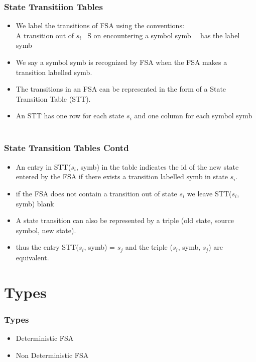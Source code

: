 \documentclass{beamer}
\begin{document}
\begin{frame}
    \frametitle{State Transitiion Tables}
    \begin{itemize}
        \item We label the transitions of FSA using the conventions:\\
            A transition out of $s_i$ \epsilon\ S on encountering a symbol symb \epsilon \ \Sigma\ has the label symb
        \item We say a symbol symb is recognized by FSA when the FSA makes a transition labelled symb.
        \item The transitions in an FSA can be represented in the form of a State Transition Table (STT).
        \item An STT has one row for each state $s_i$ and one column for each symbol symb \epsilon\ \Sigma\
    \end{itemize}
\end{frame}

\begin{frame}
    \frametitle{State Transition Tables Contd}
    \begin{itemize}
        \item An entry in STT($s_i$, symb) in the table indicates the id of the new state entered by the FSA if there exists a transition labelled symb in state $s_i$.
        \item if the FSA does not contain a transition out of state $s_i$ we leave STT($s_i$, symb) blank    
        \item A state transition can also be represented by a triple (old state, source symbol, new state).
        \item thus the entry STT($s_i$, symb) = $s_j$ and the triple ($s_i$, symb, $s_j$) are equivalent.

    \end{itemize}
\end{frame}
\section{Types}
\begin{frame}
    \frametitle{Types}
    \begin{itemize}
        \item Deterministic FSA
        \item Non Deterministic FSA
    \end{itemize}
\end{frame}
\end{document}
